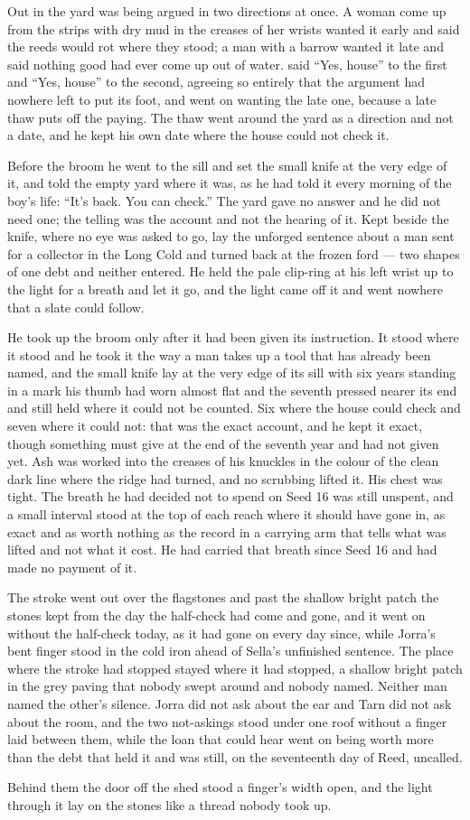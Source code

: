Out in the yard  was being argued in two directions at once. A woman come up from the strips with dry mud in the creases of her wrists wanted it early and said the reeds would rot where they stood; a man with a barrow wanted it late and said nothing good had ever come up out of water.  said “Yes, house” to the first and “Yes, house” to the second, agreeing so entirely that the argument had nowhere left to put its foot, and went on wanting the late one, because a late thaw puts off the paying. The thaw went around the yard as a direction and not a date, and he kept his own date where the house could not check it.

Before the broom he went to the sill and set the small knife at the very edge of it, and told the empty yard where it was, as he had told it every morning of the boy's life: “It's back. You can check.” The yard gave no answer and he did not need one; the telling was the account and not the hearing of it. Kept beside the knife, where no eye was asked to go, lay the unforged sentence about a man sent for a collector in the Long Cold and turned back at the frozen ford --- two shapes of one debt and neither entered. He held the pale clip-ring at his left wrist up to the light for a breath and let it go, and the light came off it and went nowhere that a slate could follow.

He took up the broom only after it had been given its instruction. It stood where it stood and he took it the way a man takes up a tool that has already been named, and the small knife lay at the very edge of its sill with six years standing in a mark his thumb had worn almost flat and the seventh pressed nearer its end and still held where it could not be counted. Six where the house could check and seven where it could not: that was the exact account, and he kept it exact, though something must give at the end of the seventh year and had not given yet. Ash was worked into the creases of his knuckles in the colour of the clean dark line where the ridge had turned, and no scrubbing lifted it. His chest was tight. The breath he had decided not to spend on Seed 16 was still unspent, and a small interval stood at the top of each reach where it should have gone in, as exact and as worth nothing as the record in a carrying arm that tells what was lifted and not what it cost. He had carried that breath since Seed 16 and had made no payment of it.

The stroke went out over the flagstones and past the shallow bright patch the stones kept from the day the half-check had come and gone, and it went on without the half-check today, as it had gone on every day since, while Jorra's bent finger stood in the cold iron ahead of Sella's unfinished sentence. The place where the stroke had stopped stayed where it had stopped, a shallow bright patch in the grey paving that nobody swept around and nobody named. Neither man named the other's silence. Jorra did not ask about the ear and Tarn did not ask about the room, and the two not-askings stood under one roof without a finger laid between them, while the loan that could hear went on being worth more than the debt that held it and was still, on the seventeenth day of Reed, uncalled.

Behind them the door off the shed stood a finger's width open, and the light through it lay on the stones like a thread nobody took up.

